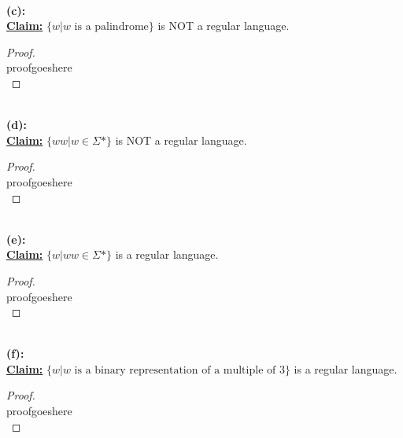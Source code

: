 \documentclass[12pt]{article}
\begin{document}
\leavevmode\\
\textbf{(c):} \\
\textbf{\underline{Claim:}} $\{ w | w \text{ is a palindrome} \}$ is NOT a regular language.
\begin{proof}
\leavevmode\\
    proofgoeshere \\
\end{proof}
\leavevmode\\
\textbf{(d):} \\
\textbf{\underline{Claim:}} $\{ ww | w \in \Sigma* \}$ is NOT a regular language.
\begin{proof}
\leavevmode\\
    proofgoeshere \\
\end{proof}
\leavevmode\\
\textbf{(e):} \\
\textbf{\underline{Claim:}} $\{ w | ww \in \Sigma* \}$ is a regular language.
\begin{proof}
\leavevmode\\
    proofgoeshere \\
\end{proof}
\leavevmode\\
\textbf{(f):} \\
\textbf{\underline{Claim:}} $\{ w | w \text{ is a binary representation of a multiple of 3} \}$ is a regular language.
\begin{proof}
\leavevmode\\
    proofgoeshere \\
\end{proof}
\leavevmode\\
\pagebreak
\end{document}
